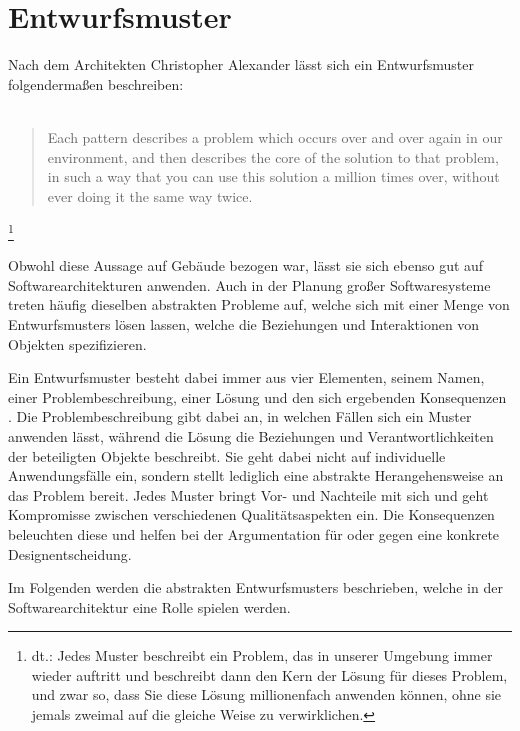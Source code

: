 \section{Entwurfsmuster}

Nach dem Architekten Christopher Alexander lässt sich ein Entwurfsmuster folgendermaßen beschreiben:\\
\\

\blockquote{Each pattern describes a problem which occurs over and over again in our environment, and then describes the core of the solution to that problem, in such a way that you can use this solution a million times over, without ever doing it the same way twice.}\footnote{dt.: Jedes Muster beschreibt ein Problem, das in unserer Umgebung immer wieder auftritt und beschreibt dann den Kern der Lösung für dieses Problem, und zwar so, dass Sie diese Lösung millionenfach anwenden können, ohne sie jemals zweimal auf die gleiche Weise zu verwirklichen.} \cite{gamma_design_1995}\\
\\

Obwohl diese Aussage auf Gebäude bezogen war, lässt sie sich ebenso gut auf Softwarearchitekturen anwenden. Auch in der Planung großer Softwaresysteme treten häufig dieselben abstrakten Probleme auf, welche sich mit einer Menge von Entwurfsmusters lösen lassen, welche die Beziehungen und Interaktionen von Objekten spezifizieren.

Ein Entwurfsmuster besteht dabei immer aus vier Elementen, seinem Namen, einer Problembeschreibung, einer Lösung und den sich ergebenden Konsequenzen \cite{gamma_design_1995}. Die Problembeschreibung gibt dabei an, in welchen Fällen sich ein Muster anwenden lässt, während die Lösung die Beziehungen und Verantwortlichkeiten der beteiligten Objekte beschreibt. Sie geht dabei nicht auf individuelle Anwendungsfälle ein, sondern stellt lediglich eine abstrakte Herangehensweise an das Problem bereit. Jedes Muster bringt Vor- und Nachteile mit sich und geht Kompromisse zwischen verschiedenen Qualitätsaspekten ein. Die Konsequenzen beleuchten diese und helfen bei der Argumentation für oder gegen eine konkrete Designentscheidung.

Im Folgenden werden die abstrakten Entwurfsmusters beschrieben, welche in der Softwarearchitektur eine Rolle spielen werden.






